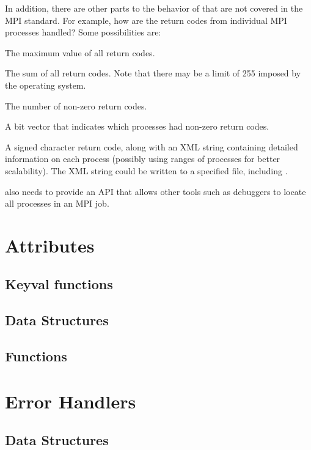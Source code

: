 \documentclass{article}
\begin{document}
In addition, there are other parts to the behavior of 
that are not covered in the MPI standard.  For example, how are the
return codes from individual MPI processes handled?  Some
possibilities are:
\begin{description}
\item The maximum value of all return codes.
\item The sum of all return codes.  Note that there may be
a limit of 255 imposed by the operating system.
\item The number of non-zero return codes.
\item A bit vector that indicates which processes had non-zero return
codes.
\item A signed character return code, along with an XML string
containing detailed information on each process (possibly using ranges
of processes for better scalability).  The XML string could be written
to a specified file, including .
\end{description}

 also needs to provide an API that allows other tools such as
debuggers to locate all processes in an MPI job.

\section{Attributes}


\subsection{Keyval functions}

\subsection{Data Structures}

\subsection{Functions}


\section{Error Handlers}
\subsection{Data Structures}

\end{document}

